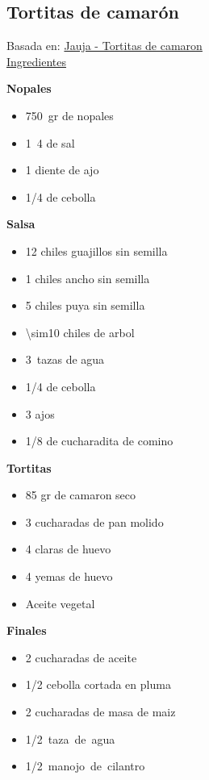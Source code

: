 \subsection{Tortitas de camarón}

Basada en: \href{https://www.youtube.com/watch?v=aD8jlQKKBWQ}{Jauja - Tortitas de camaron} \\

\underline{Ingredientes}

\textbf{Nopales}
\begin{itemize}
\item \SI{750}{gr} de nopales
\item \SI{1}{4} de sal
\item 1 diente de ajo
\item \num{1/4} de cebolla
\end{itemize}

\textbf{Salsa}
\begin{itemize}
\item 12 chiles guajillos sin semilla
\item 1 chiles ancho sin semilla
\item 5 chiles puya sin semilla
\item \num{\sim10} chiles de arbol
\item \SI{3}{tazas} de agua
\item \num{1/4} de cebolla
\item 3 ajos
\item \num{1/8} de cucharadita de comino
\end{itemize}

\textbf{Tortitas}
\begin{itemize}
\item 85 gr de camaron seco
\item 3 cucharadas de pan molido
\item 4 claras de huevo
\item 4 yemas de huevo
\item Aceite vegetal
\end{itemize}

\textbf{Finales}
\begin{itemize}
\item 2 cucharadas de aceite
\item \num{1/2} cebolla cortada en pluma
\item 2 cucharadas de masa de maiz
\item \SI{1/2}{taza de agua}
\item \SI{1/2}{manojo de cilantro}
\end{itemize}

